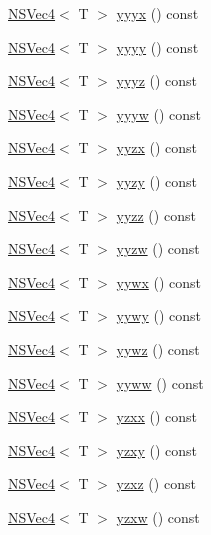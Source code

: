 \begin{DoxyCompactItemize}
\item 
\hyperlink{structNSVec4}{N\-S\-Vec4}$<$ T $>$ \hyperlink{structNSVec4_a50e1a62f42a87cbe7220da2c2ac5c0da}{yyyx} () const 
\item 
\hyperlink{structNSVec4}{N\-S\-Vec4}$<$ T $>$ \hyperlink{structNSVec4_a98fd4139b704f6198575df2e7cdca98e}{yyyy} () const 
\item 
\hyperlink{structNSVec4}{N\-S\-Vec4}$<$ T $>$ \hyperlink{structNSVec4_a8f24b1491ae8559d7715d5a407d89c2a}{yyyz} () const 
\item 
\hyperlink{structNSVec4}{N\-S\-Vec4}$<$ T $>$ \hyperlink{structNSVec4_aaaae3b36a69db72f95d3897ad2c05f30}{yyyw} () const 
\item 
\hyperlink{structNSVec4}{N\-S\-Vec4}$<$ T $>$ \hyperlink{structNSVec4_a177ec79515de1b608edcdd6ec3f34617}{yyzx} () const 
\item 
\hyperlink{structNSVec4}{N\-S\-Vec4}$<$ T $>$ \hyperlink{structNSVec4_a859ded9357b486822a00df81d77c8e5e}{yyzy} () const 
\item 
\hyperlink{structNSVec4}{N\-S\-Vec4}$<$ T $>$ \hyperlink{structNSVec4_a06983238c623a8027ce80f61431f9b92}{yyzz} () const 
\item 
\hyperlink{structNSVec4}{N\-S\-Vec4}$<$ T $>$ \hyperlink{structNSVec4_a04e96aa46d293baf4db9689f9c1a7e74}{yyzw} () const 
\item 
\hyperlink{structNSVec4}{N\-S\-Vec4}$<$ T $>$ \hyperlink{structNSVec4_ada5cd588f1f37d968ef6703908145337}{yywx} () const 
\item 
\hyperlink{structNSVec4}{N\-S\-Vec4}$<$ T $>$ \hyperlink{structNSVec4_ab05ad570675a44a2ae12a1e4b0cc7012}{yywy} () const 
\item 
\hyperlink{structNSVec4}{N\-S\-Vec4}$<$ T $>$ \hyperlink{structNSVec4_a85ace564383d7150a5c75f019465e1e5}{yywz} () const 
\item 
\hyperlink{structNSVec4}{N\-S\-Vec4}$<$ T $>$ \hyperlink{structNSVec4_ac08297f2478d3089d7a11dae4367228e}{yyww} () const 
\item 
\hyperlink{structNSVec4}{N\-S\-Vec4}$<$ T $>$ \hyperlink{structNSVec4_a046ae465d9599a2af04aed3eec108dcb}{yzxx} () const 
\item 
\hyperlink{structNSVec4}{N\-S\-Vec4}$<$ T $>$ \hyperlink{structNSVec4_a45336209e059a6d9928146c2d22b2dc6}{yzxy} () const 
\item 
\hyperlink{structNSVec4}{N\-S\-Vec4}$<$ T $>$ \hyperlink{structNSVec4_ab65656152cb99d04deb21bd5b635697d}{yzxz} () const 
\item 
\hyperlink{structNSVec4}{N\-S\-Vec4}$<$ T $>$ \hyperlink{structNSVec4_afbc0b3bfc490540eaccdace915bcbb74}{yzxw} () const 

\end{DoxyCompactItemize}
